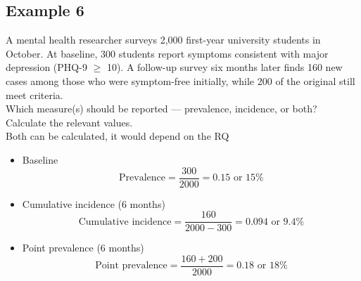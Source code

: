 \documentclass{article}
\begin{document}
\subsection{Example 6}
A mental health researcher surveys 2,000 first-year university students in October. At
baseline, 300 students report symptoms consistent with major depression (PHQ-9 $\geq$ 10).
A follow-up survey six months later finds 160 new cases among those who were
symptom-free initially, while 200 of the original still meet criteria.
\\
Which measure(s) should be reported — prevalence, incidence, or both? Calculate the relevant values.
\\
Both can be calculated, it would depend on the RQ
\begin{itemize}
    \item Baseline
        \begin{equation*}
            \text{Prevalence} = \dfrac{300}{2000} = 0.15 \text{ or 15\%}
        \end{equation*}
    \item Cumulative incidence (6 months)
        \begin{equation*}
            \text{Cumulative incidence} = \dfrac{160}{2000 - 300} = 0.094 \text{ or 9.4\%}
        \end{equation*}
    \item Point prevalence (6 months)
        \begin{equation*}
            \text{Point prevalence} = \dfrac{160 + 200}{2000} = 0.18 \text{ or 18\%}
        \end{equation*}

\end{itemize}
\end{document}
